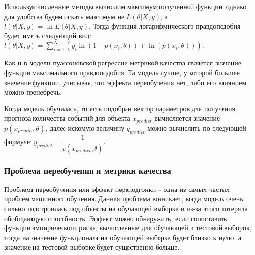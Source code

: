 Используя численные методы вычислим максимум полученной функции, однако для удобства будем искать максимум не $L(\theta | X,y)$, а $l(\theta | X,y) = \ln L(\theta | X,y)$. Тогда функция логарифмического правдоподобия будет иметь следующий вид: $l(\theta | X,y) = \sum\limits_{i = 1}^N ( y_i \ln(1 - p(x_i,\theta)) + \ln(p(x_i,\theta)) )$.

Как и в модели пуассоновской регрессии метрикой качества является значение функции максимального правдоподобия. Та модель лучше, у которой большее значение функции, учитывая, что эффекта переобучения нет, либо его влиянием можно пренебречь.

Когда модель обучилась, то есть подобран вектор параметров для получения прогноза количества событий для объекта $x_{predict}$ вычисляется значение $p(x_{predict}, \theta)$, далее искомую величину $y_{predict}$ можно вычислить по следующей формуле: $y_{predict} = \dfrac{1}{p(x_{predict}, \theta)}$.

\subsubsection{Проблема переобучения и метрики качества}

Проблема переобучения или эффект переподгонки -- одна из самых частых проблем машинного обучения. Данная проблема возникает, когда модель очень сильно подстроилась под объекты на обучающей выборке и из-за этого потеряла обобщающую способность. Эффект можно обнаружить, если сопоставить функции эмпирического риска, вычисленные для обучающей и тестовой выборок, тогда на значение функционала на обучающей выборке будет близко к нулю, а значение на тестовой выборке будет существенно больше.

